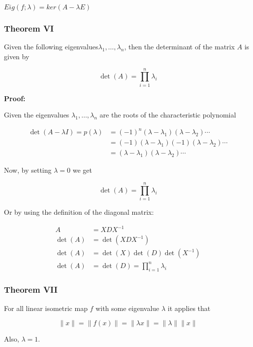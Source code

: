 \(Eig(f;\lambda) = ker(A - \lambda E)\)

\subsubsection{Theorem VI}

Given the following eigenvalues\(\lambda_1, \dots, \lambda_n\), then the 
determinant of the matrix \(A\) is given by 

\[
    \det(A) = \prod_{i = 1}^{n} \lambda_i
\]

\textbf{Proof:}

Given the eigenvalues \(\lambda_1, \dots, \lambda_n\) are the roots of the characteristic polynomial

\begin{align*}
    \det(A - \lambda I) = p (\lambda) &= (-1)^{n}(\lambda - \lambda_1)(\lambda - \lambda_2)\cdots\\
                                      &= (-1)(\lambda - \lambda_1)(-1)(\lambda - \lambda_2)\cdots\\     
                                      &= (\lambda - \lambda_1)(\lambda - \lambda_2)\cdots                       
\end{align*}

Now, by setting \(\lambda = 0\) we get 

\[
    \det(A) = \prod_{i = 1}^{n} \lambda_i
\]

Or by using the definition of the diagonal matrix:

\begin{align*}
    A &= XDX^{-1} \\
   \det(A) &= \det(XDX^{-1})\\
   \det(A) &= \det(X)\det(D)\det(X^{-1})\\
   \det(A) &= \det(D) = \prod_{i = 1}^{n} \lambda_i
\end{align*}

\QED

\subsubsection{Theorem VII}

For all linear isometric map \(f\) with some eigenvalue \(\lambda\) it applies that

\[
    \|x\| = \|f(x)\| = \|\lambda x\| = \|\lambda\|\|x\|
\]

Also, \(\lambda = 1\).
\vspace{\baselineskip}

